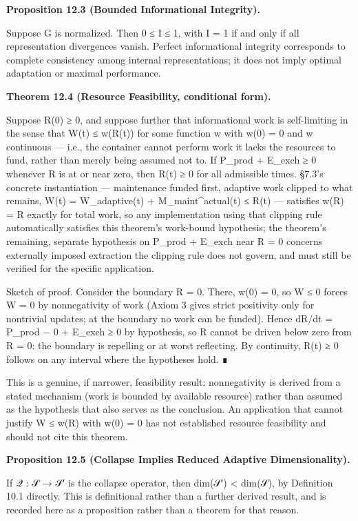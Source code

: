 \documentclass[
]{article}
\begin{document}
\textbf{Proposition 12.3 (Bounded Informational Integrity).}

Suppose G is normalized. Then 0 ≤ I ≤ 1, with I = 1 if and only if all
representation divergences vanish. Perfect informational integrity
corresponds to complete consistency among internal representations; it
does not imply optimal adaptation or maximal performance.

\textbf{Theorem 12.4 (Resource Feasibility, conditional form).}

Suppose R(0) ≥ 0, and suppose further that informational work is
self-limiting in the sense that W(t) ≤ w(R(t)) for some function w with
w(0) = 0 and w continuous --- i.e., the container cannot perform work it
lacks the resources to fund, rather than merely being assumed not to. If
P\_prod + E\_exch ≥ 0 whenever R is at or near zero, then R(t) ≥ 0 for
all admissible times. §7.3's concrete instantiation --- maintenance
funded first, adaptive work clipped to what remains, W(t) =
W\_adaptive(t) + M\_maint\^{}actual(t) ≤ R(t) --- satisfies w(R) = R
exactly for total work, so any implementation using that clipping rule
automatically satisfies this theorem's work-bound hypothesis; the
theorem's remaining, separate hypothesis on P\_prod + E\_exch near R = 0
concerns externally imposed extraction the clipping rule does not
govern, and must still be verified for the specific application.

Sketch of proof. Consider the boundary R = 0. There, w(0) = 0, so W ≤ 0
forces W = 0 by nonnegativity of work (Axiom 3 gives strict positivity
only for nontrivial updates; at the boundary no work can be funded).
Hence dR/dt = P\_prod − 0 + E\_exch ≥ 0 by hypothesis, so R cannot be
driven below zero from R = 0: the boundary is repelling or at worst
reflecting. By continuity, R(t) ≥ 0 follows on any interval where the
hypotheses hold. ∎

This is a genuine, if narrower, feasibility result: nonnegativity is
derived from a stated mechanism (work is bounded by available resource)
rather than assumed as the hypothesis that also serves as the
conclusion. An application that cannot justify W ≤ w(R) with w(0) = 0
has not established resource feasibility and should not cite this
theorem.

\textbf{Proposition 12.5 (Collapse Implies Reduced Adaptive
Dimensionality).}

If 𝒬 : 𝒮 → 𝒮′ is the collapse operator, then dim(𝒮′) \textless{} dim(𝒮),
by Definition 10.1 directly. This is definitional rather than a further
derived result, and is recorded here as a proposition rather than a
theorem for that reason.
\end{document}
